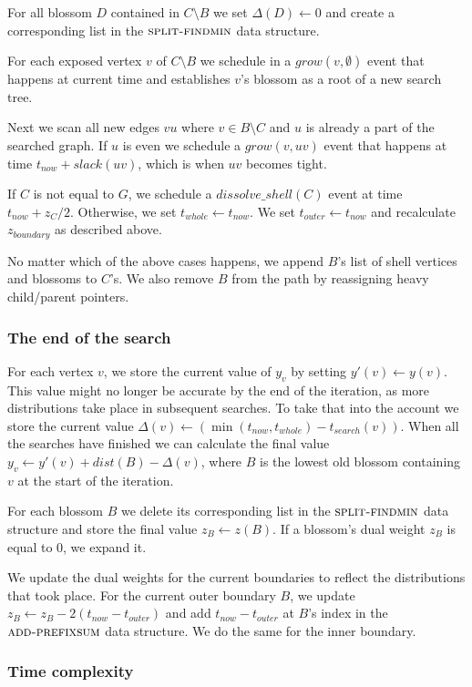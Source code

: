 For all blossom $D$ contained in $C \setminus B$ we set $\Delta(D) \gets 0$ and create a corresponding list in the $\textsc{split-findmin}$ data structure.

For each exposed vertex $v$ of $C \setminus B$ we schedule in a $grow(v, \emptyset)$ event that happens at current time and establishes $v$'s blossom as a root of a new search tree.

Next we scan all new edges $vu$ where $v \in B \setminus C$ and $u$ is already a part of the  searched graph. If $u$ is even we schedule a $grow(v, uv)$ event that happens at time $t_{now} + slack(uv)$, which is when $uv$ becomes tight. 

If $C$ is not equal to $G$, we schedule a $dissolve\_shell(C)$ event at time $t_{now} + z_C / 2$. Otherwise, we set $t_{whole} \gets t_{now}$. We set $t_{outer} \gets t_{now}$ and recalculate $z_{boundary}$ as described above.

No matter which of the above cases happens, we append $B$'s list of shell vertices and blossoms to $C$'s. We also remove $B$ from the path by reassigning heavy child/parent pointers.

\subsubsection*{The end of the search} 
For each vertex $v$, we store the current value of $y_v$ by setting $y'(v) \gets y(v)$. This value might no longer be accurate by the end of the iteration, as more distributions take place in subsequent searches. To take that into the account we store the current value $\Delta(v) \gets (\min(t_{now}, t_{whole}) - t_{search}(v))$. When all the searches have finished we can calculate the final value $y_v \gets y'(v) + dist(B) - \Delta(v)$, where $B$ is the lowest old blossom containing $v$ at the start of the iteration.

For each blossom $B$ we delete its corresponding list in the $\textsc{split-findmin}$ data structure and store the final value $z_B \gets z(B)$. If a blossom's dual weight $z_B$ is equal to $0$, we expand it.

We update the dual weights for the current boundaries to reflect the distributions that took place. For the current outer boundary $B$, we update $z_B \gets z_B - 2(t_{now} - t_{outer})$ and add $t_{now} - t_{outer}$ at $B$'s index in the $\textsc{add-prefixsum}$ data structure. We do the same for the inner boundary.

\subsubsection*{Time complexity} 

